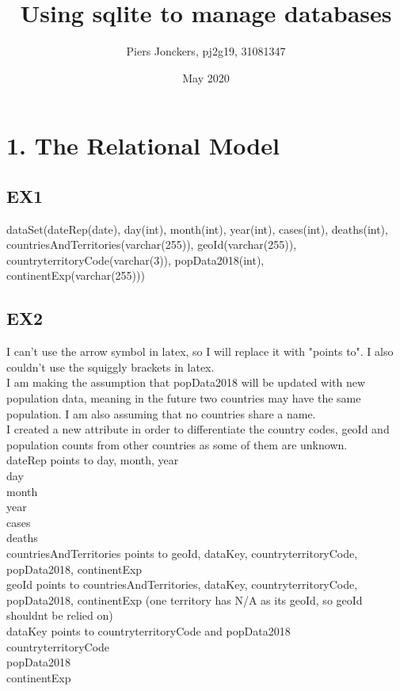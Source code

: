 \documentclass{article}
\title{Using sqlite to manage databases}
\author{Piers Jonckers, pj2g19, 31081347}
\date{May 2020}
\begin{document}
\maketitle

\section{1. The Relational Model}
\subsection{EX1}
dataSet(dateRep(date), day(int), month(int), year(int), cases(int), deaths(int), countriesAndTerritories(varchar(255)), geoId(varchar(255)), countryterritoryCode(varchar(3)), popData2018(int), continentExp(varchar(255)))\\

\subsection{EX2}
I can't use the arrow symbol in latex, so I will replace it with "points to". I also couldn't use the squiggly brackets in latex.\\
I am making the assumption that popData2018 will be updated with new population data, meaning in the future two countries may have the same population. I am also assuming that no countries share a name.\\
I created a new attribute in order to differentiate the country codes, geoId and population counts from other countries as some of them are unknown.\\
dateRep points to day, month, year\\
day\\
month\\
year\\
cases\\
deaths\\
countriesAndTerritories points to geoId, dataKey, countryterritoryCode, popData2018, continentExp\\
geoId points to countriesAndTerritories, dataKey, countryterritoryCode, popData2018, continentExp (one territory has N/A as its geoId, so geoId shouldnt be relied on)\\
dataKey points to countryterritoryCode and popData2018\\
countryterritoryCode\\
popData2018\\
continentExp\\
\end{document}

